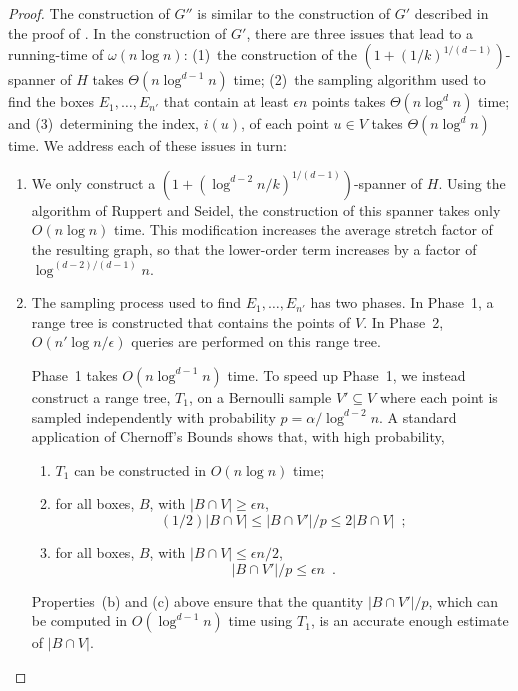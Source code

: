 \documentclass{patmorin}
\begin{document}
\begin{proof}
  The construction of $G''$ is similar to the construction of
  $G'$ described in the proof of .  In the
  construction of $G'$, there are three issues that lead to a
  running-time of $\omega(n\log n)$: (1)~the construction of the
  $(1+(1/k)^{1/(d-1)})$-spanner of $H$ takes $\Theta(n\log^{d-1} n)$ time;
  (2)~the sampling algorithm used to find the boxes $E_1,\ldots,E_{n'}$
  that contain at least $\epsilon n$ points takes $\Theta(n\log^{d} n)$
  time; and (3)~determining the index, $i(u)$, of each point $u\in V$
  takes $\Theta(n\log^d n)$ time.  
  We address each of these issues in turn:  
  \begin{enumerate}
     \item We only construct a $(1+(\log^{d-2}
      n/k)^{1/(d-1)})$-spanner of $H$.  Using the algorithm of Ruppert
      and Seidel, the construction of this spanner takes only $O(n\log
      n)$ time.  This modification increases the average stretch factor
      of the resulting graph, so that the lower-order term increases by
      a factor of $\log^{(d-2)/(d-1)} n$.

     \item The sampling process used to find $E_1,\ldots,E_{n'}$
     has two phases.  In Phase~1, a range tree is constructed
     that contains the points of $V$.  In Phase~2, $O(n'\log
     n/\epsilon)$ queries are performed on this range tree.

     Phase~1 takes $O(n\log^{d-1} n)$ time.  To speed up Phase~1,
     we instead construct a range tree, $T_1$, on a Bernoulli sample
     $V'\subseteq V$ where each point is sampled independently with
     probability $p=\alpha/\log^{d-2} n$.  A standard application of
     Chernoff's Bounds \cite[Appendix~A.1]{alon.spencer:probabilistic}
     shows that, with high probability,
     \begin{enumerate}
       \item $T_1$ can be constructed in $O(n\log n)$ time;
       \item for all boxes, $B$, with $|B\cap V|\ge \epsilon n$,
       \[  
           (1/2)|B\cap V|\le  |B\cap V'|/p \le 2|B\cap V| \enspace;
       \]
       \item for all boxes, $B$, with $|B\cap V|\le \epsilon n/2$,
       \[    
           |B\cap V'|/p \le \epsilon n \enspace .
       \]
     \end{enumerate}
     Properties~(b) and (c) above ensure that the quantity $|B\cap V'|/p$,
     which can be computed in $O(\log^{d-1} n)$ time using $T_1$, is an
     accurate enough estimate of $|B\cap V|$.


\end{enumerate}
\end{proof}
\end{document}

